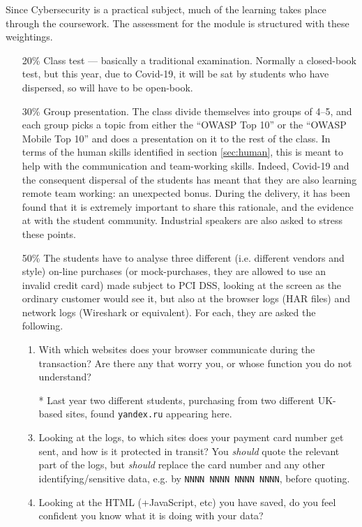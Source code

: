 \documentclass[conference]{IEEEtran}
\begin{document}
Since Cybersecurity is a practical subject, much of the learning takes place through the coursework. The assessment for the module is structured with these weightings.
\begin{itemize}
\item[20\%]Class test --- basically a traditional examination. Normally a closed-book test, but this year, due to Covid-19, it will be sat by students who have dispersed, so will have to be open-book.
\item[30\%]Group presentation. The class divide themselves into groups of 4--5, and each group picks a topic from either the ``OWASP Top 10'' \cite{OWASP2017a} or the ``OWASP Mobile Top  10'' \cite{OWASP2016a} and does a presentation on it to the rest of the class.  In terms of the human skills identified in section \ref{sec:human}, this is meant to help with the communication and team-working skills. Indeed, Covid-19 and the consequent dispersal of the students has meant that they are also learning remote team working: an unexpected bonus.  During the delivery, it has been found that it is extremely important to share this rationale, and the evidence at \cite{WallStreetJournal2018c,InfoSec2019a,Beaver2019c} with the student community.  Industrial speakers are also asked to stress these points.
\item[50\%]The students have to analyse three different (i.e. different vendors and style) on-line purchases (or mock-purchases, they are allowed to use an invalid  credit card) made subject to PCI DSS, looking at the screen as the ordinary customer would see it, but also at the browser logs (HAR files) and network logs (Wireshark or equivalent). For each, they are asked the following.
\begin{enumerate}
\item With which websites does your browser communicate during the transaction? Are there any that worry you, or whose function you do not understand?
\item[*]Last year two different students, purchasing from two different UK-based sites, found \verb+yandex.ru+ appearing here.
\item Looking at the logs, to which sites does your payment card number get sent, and how is it protected in transit? You \emph{should} quote the relevant part of the logs, but \emph{should} replace the card number and any other identifying/sensitive data, e.g. by \verb+NNNN NNNN NNNN NNNN+, before quoting.
\item Looking at the HTML (+JavaScript, etc) you have saved, do you feel confident you know what it is doing with your data?

\end{enumerate}
\end{itemize}
\end{document}
